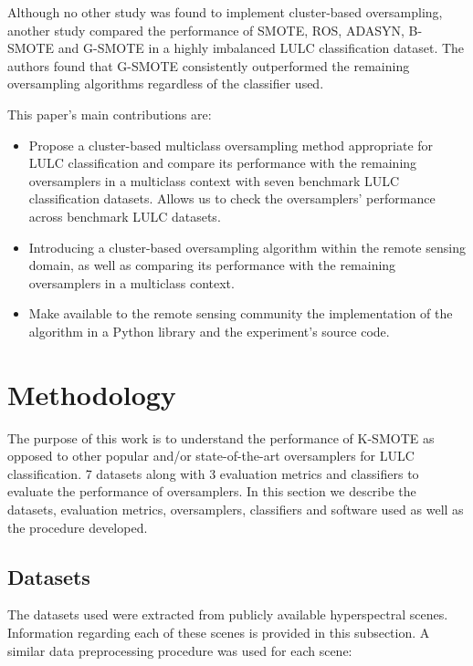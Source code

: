 \documentclass[remotesensing,article,submit,moreauthors,pdftex]{Definitions/mdpi}
\begin{document}
\begin{paracol}{2}
\linenumbers
\switchcolumn

Although no other study was found to implement cluster-based oversampling,
another study \cite{Douzas2019rs} compared the performance of SMOTE, ROS,
ADASYN, B-SMOTE and G-SMOTE in a highly imbalanced LULC classification dataset.
The authors found that G-SMOTE consistently outperformed the remaining
oversampling algorithms regardless of the classifier used.

This paper's main contributions are:
\begin{itemize}
    \item Propose a cluster-based multiclass oversampling method appropriate
        for LULC classification and compare its performance with the remaining
        oversamplers in a multiclass context with seven benchmark LULC
        classification datasets. Allows us to check the oversamplers'
        performance across benchmark LULC datasets.
    \item Introducing a cluster-based oversampling algorithm within the remote
        sensing domain, as well as comparing its performance with the remaining
        oversamplers in a multiclass context.
    \item Make available to the remote sensing community the implementation
        of the algorithm in a Python library and the experiment's source code.
\end{itemize}

\section{Methodology}\label{sec:methodology}

The purpose of this work is to understand the performance of K-SMOTE as
opposed to other popular and/or state-of-the-art oversamplers for LULC
classification.  7
 datasets  along
with 3 evaluation metrics and  classifiers to evaluate the performance of
oversamplers. In this section we describe the datasets, evaluation metrics,
oversamplers, classifiers and software used as well as the procedure
developed.

\subsection{Datasets}

The datasets used were extracted from publicly available hyperspectral scenes.
Information regarding each of these scenes is provided in this subsection. A
similar data preprocessing procedure was used for each scene: 



\end{paracol}
\end{document}
